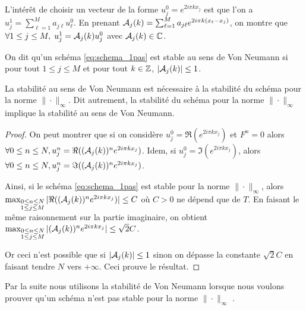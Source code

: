 \documentclass[12pt,a4paper,twoside]{article}
\begin{document}
L'int\'er\^et de choisir un vecteur de la forme $u_j^0 = e^{2 i \pi k x_j}$
est que l'on a $u_j^1 = \sum_{\ell=1}^{M} a_{j \ell} u_{\ell}^{0}$.
En prenant $\mathcal{A}_j(k) = \sum_{\ell=1}^{M} a_{j\ell} e^{2i\pi k (x_{\ell} - x_j)}$, on montre
que $\forall 1\leq j \leq M, \;  u_j^{1} = \mathcal{A}_j(k) u_j^0$ avec $\mathcal{A}_j(k) \in \mathbb{C}$.
\begin{definition}
  On dit qu'un sch\'ema \eqref{eq:schema_1pas} est stable au
  sens de Von Neumann si pour tout $1 \leq j \leq M$ 
  et pour tout $k \in \mathbb{Z}$, $| \mathcal{A}_j(k) | \leq 1$.
\end{definition}
\begin{proposition}
  \label{prop:Von_Neumann_nec}
  La stabilit\'e au sens de Von Neumann est n\'ecessaire \`a la stabilit\'e du sch\'ema
  pour la norme $\| \cdot \|_{\infty}$.
  Dit autrement, la stabilit\'e du sch\'ema pour la norme $\| \cdot \|_{\infty}$ implique la stabilit\'e au sens de 
  Von Neumann.
\end{proposition}
\begin{proof}
  On peut montrer que si on consid\`ere $u_j^0 = \Re (e^{2 i \pi k x_j})$
  et $F^n = 0$
  alors $\forall 0 \leq n \leq N, u_j^n = \Re ((\mathcal{A}_j(k))^n e^{2 i \pi k x_j})$.
  Idem, si $u_j^0 = \Im (e^{2 i \pi k x_j})$, 
  alors $\forall 0 \leq n \leq N, u_j^n = \Im ((\mathcal{A}_j(k))^n e^{2 i \pi k x_j})$.
  
  Ainsi, si le sch\'ema \eqref{eq:schema_1pas} est stable pour la norme $\| \cdot \|_{\infty}$, alors
  $\max_{\substack{0 \leq n \leq N \\ 1 \leq j \leq M}} 
  | \Re ((\mathcal{A}_j(k))^n e^{2 i \pi k x_j})| \leq C$ o\`u $C>0$ ne d\'epend que de $T$.
  En faisant le m\^eme raisonnement sur la partie imaginaire,
  on obtient
  $\max_{\substack{0 \leq n \leq N \\ 1 \leq j \leq M}} 
  | (\mathcal{A}_j(k))^n e^{2 i \pi k x_j}| \leq \sqrt{2}C$.
  
  Or ceci n'est possible que si $| \mathcal{A}_j(k) | \leq 1$ sinon on d\'epasse
  la constante $\sqrt{2}C$ en faisant tendre $N$ vers $+\infty$.
  Ceci prouve le r\'esultat.
\end{proof}


Par la suite nous utilisons la stabilit\'e de Von Neumann lorsque nous voulons 
prouver qu'un sch\'ema n'est pas stable pour la norme $\| \cdot \|_{\infty}$ .


\end{document}
